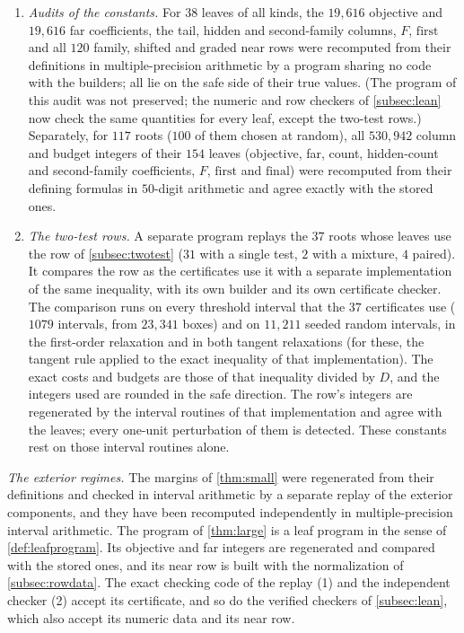 \documentclass[11pt]{amsart}
\numberwithin{equation}{section}
\theoremstyle{plain}
\theoremstyle{definition}
\theoremstyle{remark}
\newcommand{\1}{\mathbf{1}}
\begin{document}
\begin{enumerate}[(1)]
    unfavourable direction, were all rejected by the replay.
  \item \emph{Audits of the constants.} For $38$ leaves of all kinds, the $19{,}616$ objective and
    $19{,}616$ far coefficients, the tail, hidden and second-family columns, $F$, $\mathrm{first}$ and
    all $120$ family, shifted and graded near rows were recomputed from their definitions in
    multiple-precision arithmetic by a program sharing no code with the builders; all lie on the
    safe side of their true values. (The program of this audit was not preserved; the numeric and
    row checkers of \cref{subsec:lean} now check the same quantities for every leaf, except the
    two-test rows.) Separately, for $117$ roots ($100$ of them chosen at random),
    all $530{,}942$ column and budget integers of their $154$ leaves (objective, far, count,
    hidden-count and second-family coefficients, $F$, $\mathrm{first}$ and $\mathrm{final}$) were
    recomputed from their defining formulas in $50$-digit arithmetic and agree exactly with the
    stored ones.
  \item \emph{The two-test rows.} A separate program replays the $37$ roots whose leaves use the
    row of \cref{subsec:twotest} ($31$ with a single test, $2$ with a mixture, $4$ paired). It
    compares the row as the certificates use it with a separate implementation of the same
    inequality, with its own builder and its own certificate checker. The
    comparison runs on every threshold interval that the $37$ certificates use ($1079$ intervals,
    from $23{,}341$ boxes) and on $11{,}211$ seeded random intervals, in the first-order relaxation
    and in both tangent relaxations (for these, the tangent rule applied to the exact inequality of
    that implementation). The exact costs and budgets are those of that inequality divided by $D$,
    and the integers used are rounded in the safe direction. The row's integers are regenerated by
    the interval routines of that implementation and agree with the leaves; every one-unit
    perturbation of them is detected. These constants rest on those interval routines alone.
\end{enumerate}

\emph{The exterior regimes.} The margins of \cref{thm:small} were regenerated from their
definitions and checked in interval arithmetic by a separate replay of the exterior components,
and they have been recomputed independently in multiple-precision interval arithmetic. The
program of \cref{thm:large} is a leaf program in the sense of \cref{def:leafprogram}. Its
objective and far integers are regenerated and compared with the stored ones, and its near row is
built with the normalization of \cref{subsec:rowdata}. The exact checking code of the replay (1)
and the independent checker (2) accept its certificate, and so do the verified checkers of
\cref{subsec:lean}, which also accept its numeric data and its near row.
\end{document}
